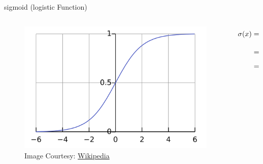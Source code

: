 \documentclass[aspectratio=169,xcolor={dvipsnames,svgnames}]{beamer}
\begin{document}
\begin{frame}[label={sec:sigmoid-logistic-function}]{sigmoid (logistic Function)}
\begin{columns}
\begin{column}{0.65\columnwidth}
\begin{figure}[htbp]
\centering
\includegraphics[width=.9\linewidth]{org-download-images/details/2024-09-16_22-50-24_screenshot.png}
\caption{Image Courtesy: \href{https://commons.wikimedia.org/wiki/File:Logistic-curve.svg}{Wikipedia}}
\end{figure}
\end{column}

\begin{column}{0.35\columnwidth}
\begin{align}
  \notag
  \sigma(x)
  &= \frac1{1+e^{-x} } \\
  \notag
  &= \frac{e^x}{1+e^x} \\
  \notag
  &= 1 - \sigma(-x)
\end{align}
\end{column}
\end{columns}
\end{frame}
\end{document}

